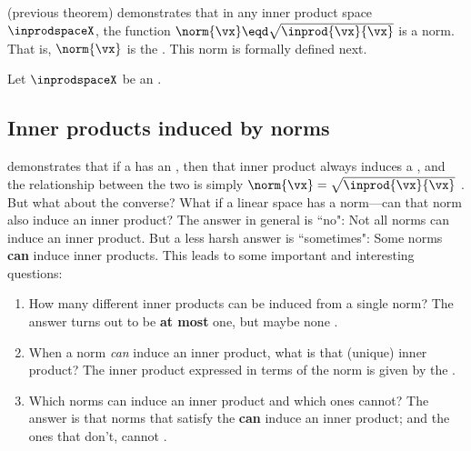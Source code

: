  (previous theorem)
demonstrates that in any inner product space\\$\inprodspaceX$,
the function $\norm{\vx}\eqd\sqrt{\inprod{\vx}{\vx}}$ is a norm.
That is, $\norm{\vx}$ is the .
This norm is formally defined next.
\begin{definition}
\label{def:norm=inprod}
\label{def:innorm}
Let $\inprodspaceX$ be an  .
\end{definition}




\subsection{Inner products induced by norms}
 demonstrates that if a   has an  ,
then that inner product always induces a  ,
and the relationship between the two is simply $\norm{\vx}=\sqrt{\inprod{\vx}{\vx}}$ .
But what about the converse?
What if a linear space has a norm---can that norm also induce an inner product?
The answer in general is ``no":
Not all norms can induce an inner product.
But a less harsh answer is ``sometimes":
Some norms {\bf can} induce inner products.
This leads to some important and interesting questions:
\begin{enumerate}
  \item How many different inner products can be induced from a single norm?
    The answer turns out to be {\bf at most} one, but maybe none .

  \item When a norm \emph{can} induce an inner product, what is that (unique) inner product?
  The inner product expressed in terms of the norm is given by the
   .

  \item Which norms can induce an inner product and which ones cannot?
    The answer is that norms that satisfy the 
     {\bf can} induce an inner product;
    and the ones that don't, cannot .
\end{enumerate}


